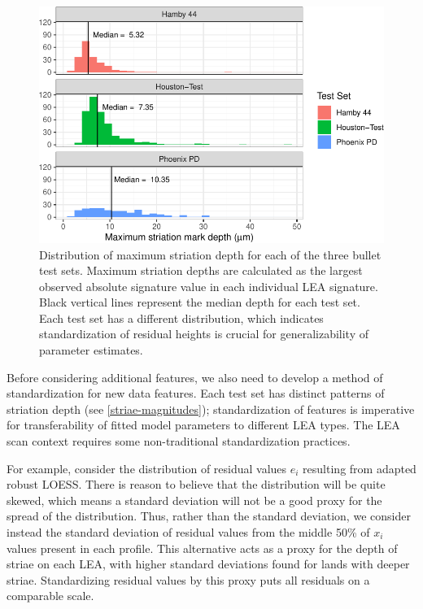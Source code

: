 \documentclass[12pt]{article}
\begin{document}
\begin{figure}
\centering
\includegraphics{writeup_files/figure-latex/striae-magnitudes-1.pdf}
\caption{\label{striae-magnitudes}Distribution of maximum striation
depth for each of the three bullet test sets. Maximum striation depths
are calculated as the largest observed absolute signature value in each
individual LEA signature. Black vertical lines represent the median
depth for each test set. Each test set has a different distribution,
which indicates standardization of residual heights is crucial for
generalizability of parameter estimates.}
\end{figure}

Before considering additional features, we also need to develop a method
of standardization for new data features. Each test set has distinct
patterns of striation depth (see \autoref{striae-magnitudes});
standardization of features is imperative for transferability of fitted
model parameters to different LEA types. The LEA scan context requires
some non-traditional standardization practices.

For example, consider the distribution of residual values \(e_i\)
resulting from adapted robust LOESS. There is reason to believe that the
distribution will be quite skewed, which means a standard deviation will
not be a good proxy for the spread of the distribution. Thus, rather
than the standard deviation, we consider instead the standard deviation
of residual values from the middle 50\% of \(x_i\) values present in
each profile. This alternative acts as a proxy for the depth of striae
on each LEA, with higher standard deviations found for lands with deeper
striae. Standardizing residual values by this proxy puts all residuals
on a comparable scale.
\end{document}
